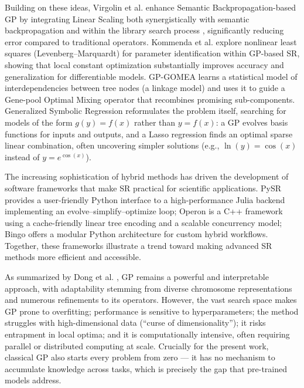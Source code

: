 Building on these ideas, Virgolin et al. \cite{virgolin_improving_2019} enhance Semantic Backpropagation-based GP by integrating Linear Scaling both synergistically with semantic backpropagation and within the library search process \cite{virgolin2019linear}, significantly reducing error compared to traditional operators. Kommenda et al. \cite{kommenda2020parameter} explore nonlinear least squares (Levenberg--Marquardt) for parameter identification within GP-based SR, showing that local constant optimization substantially improves accuracy and generalization for differentiable models. GP-GOMEA \cite{virgolin_improving_2019} learns a statistical model of interdependencies between tree nodes (a linkage model) and uses it to guide a Gene-pool Optimal Mixing operator that recombines promising sub-components. Generalized Symbolic Regression \cite{tohme2022gsr} reformulates the problem itself, searching for models of the form $g(y) = f(x)$ rather than $y = f(x)$: a GP evolves basis functions for inputs and outputs, and a Lasso regression finds an optimal sparse linear combination, often uncovering simpler solutions (e.g., $\ln(y) = \cos(x)$ instead of $y = e^{\cos(x)}$).

The increasing sophistication of hybrid methods has driven the development of software frameworks that make SR practical for scientific applications. PySR provides a user-friendly Python interface to a high-performance Julia backend implementing an evolve--simplify--optimize loop; Operon is a C++ framework using a cache-friendly linear tree encoding and a scalable concurrency model; Bingo \cite{randall_bingo_2022} offers a modular Python architecture for custom hybrid workflows. Together, these frameworks illustrate a trend toward making advanced SR methods more efficient and accessible.

As summarized by Dong et al. \cite{dong2025RecentAdvances}, GP remains a powerful and interpretable approach, with adaptability stemming from diverse chromosome representations and numerous refinements to its operators. However, the vast search space makes GP prone to overfitting; performance is sensitive to hyperparameters; the method struggles with high-dimensional data (``curse of dimensionality''); it risks entrapment in local optima; and it is computationally intensive, often requiring parallel or distributed computing at scale. Crucially for the present work, classical GP also starts every problem from zero --- it has no mechanism to accumulate knowledge across tasks, which is precisely the gap that pre-trained models address.

